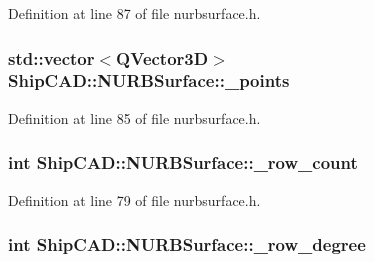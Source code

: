 Definition at line 87 of file nurbsurface.\-h.

\hypertarget{classShipCAD_1_1NURBSurface_a371421f0aec85ad3cffc3dbeeb0b26e4}{
\subsubsection[{\-\_\-points}]{\setlength{\rightskip}{0pt plus 5cm}std\-::vector$<$Q\-Vector3\-D$>$ Ship\-C\-A\-D\-::\-N\-U\-R\-B\-Surface\-::\-\_\-points\hspace{0.3cm}{\ttfamily [protected]}}}\label{classShipCAD_1_1NURBSurface_a371421f0aec85ad3cffc3dbeeb0b26e4}


Definition at line 85 of file nurbsurface.\-h.

\hypertarget{classShipCAD_1_1NURBSurface_a251739da98a877b8d68722db5aa59371}{
\subsubsection[{\-\_\-row\-\_\-count}]{\setlength{\rightskip}{0pt plus 5cm}int Ship\-C\-A\-D\-::\-N\-U\-R\-B\-Surface\-::\-\_\-row\-\_\-count\hspace{0.3cm}{\ttfamily [protected]}}}\label{classShipCAD_1_1NURBSurface_a251739da98a877b8d68722db5aa59371}


Definition at line 79 of file nurbsurface.\-h.

\hypertarget{classShipCAD_1_1NURBSurface_a0c53705ad7cc3004e60398f38909f59e}{
\subsubsection[{\-\_\-row\-\_\-degree}]{\setlength{\rightskip}{0pt plus 5cm}int Ship\-C\-A\-D\-::\-N\-U\-R\-B\-Surface\-::\-\_\-row\-\_\-degree\hspace{0.3cm}{\ttfamily [protected]}}}\label{classShipCAD_1_1NURBSurface_a0c53705ad7cc3004e60398f38909f59e}


